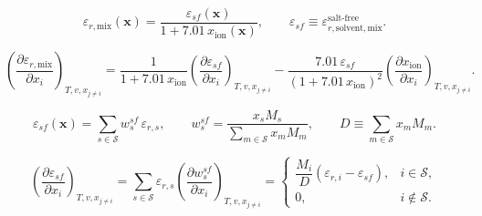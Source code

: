 \documentclass[12pt, letterpaper]{article}
\begin{document}
\begin{equation}
    \varepsilon_{r,\mathrm{mix}}(\mathbf{x})
    =
    \frac{\varepsilon_{sf}(\mathbf{x})}{1+7.01\,x_{\mathrm{ion}}(\mathbf{x})},
    \qquad
    \varepsilon_{sf}\equiv \varepsilon_{r,\mathrm{solvent,mix}}^{\mathrm{salt\text{-}free}} .
    \label{eq:epsr_mix_suppressed}
\end{equation}


\begin{equation}
    \left(\frac{\partial \varepsilon_{r,\mathrm{mix}}}{\partial x_{i}}\right)_{T,v,x_{j\neq i}}
    =
    \frac{1}{1+7.01\,x_{\mathrm{ion}}}
    \left(\frac{\partial \varepsilon_{sf}}{\partial x_{i}}\right)_{T,v,x_{j\neq i}}
    -\frac{7.01\,\varepsilon_{sf}}{\left(1+7.01\,x_{\mathrm{ion}}\right)^2}
    \left(\frac{\partial x_{\mathrm{ion}}}{\partial x_{i}}\right)_{T,v,x_{j\neq i}} .
    \label{eq:depsr_mix_dxi}
\end{equation}


\begin{equation}
    \varepsilon_{sf}(\mathbf{x})
    =
    \sum_{s\in\mathcal{S}} w_{s}^{sf}\,\varepsilon_{r,s},
    \qquad
    w_{s}^{sf}
    =
    \frac{x_{s} M_{s}}{\displaystyle \sum_{m\in\mathcal{S}} x_{m} M_{m}},
    \qquad
    D\equiv \sum_{m\in\mathcal{S}} x_{m} M_{m} .
    \label{eq:epsr_sf}
\end{equation}


\begin{equation}
    \left(\frac{\partial \varepsilon_{sf}}{\partial x_{i}}\right)_{T,v,x_{j\neq i}}
    =
    \sum_{s\in\mathcal{S}} \varepsilon_{r,s}
    \left(\frac{\partial w_{s}^{sf}}{\partial x_{i}}\right)_{T,v,x_{j\neq i}}
    =
    \begin{cases}
        \dfrac{M_{i}}{D}\left(\varepsilon_{r,i}-\varepsilon_{sf}\right), & i\in\mathcal{S},    \\[10pt]
        0,                                                             & i\notin\mathcal{S}.
    \end{cases}
    \label{eq:depsr_sf_dxi}
\end{equation}
\end{document}

